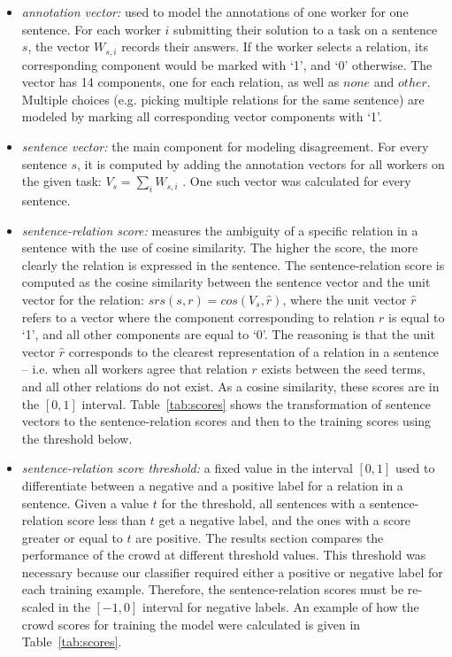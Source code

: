 \begin{itemize}

\item \textit{annotation vector:} used to model the annotations of one worker for one sentence.  For each worker $i$ submitting their solution to a task on a sentence $s$, the vector $W_{s,i}$ records their answers. If the worker selects a relation, its corresponding component would be marked with `1', and `0' otherwise.  The vector has 14 components, one for each relation, as well as $none$ and $other$. Multiple choices (e.g. picking multiple relations for the same sentence) are modeled by marking all corresponding vector components with `1'.

\item \textit{sentence vector:} the main component for modeling disagreement.  For every sentence $s$, it is computed by adding the annotation vectors for all workers on the given task: $V_{s} = \sum_{i}{W_{s,i}}$ .  One such vector was calculated for every sentence.   

\item \textit{sentence-relation score:} measures the ambiguity of a specific relation in a sentence with the use of cosine similarity. The higher the score, the more clearly the relation is expressed in the sentence. The sentence-relation score is computed as the cosine similarity between the sentence vector and the unit vector for the relation: $ srs(s, r) = cos(V_s, \hat{r}) $, where the unit vector $\hat{r}$ refers to a vector where the component corresponding to relation $r$ is equal to `1', and all other components are equal to `0'. The reasoning is that the unit vector $\hat{r}$ corresponds to the clearest representation of a relation in a sentence -- i.e. when all workers agree that relation $r$ exists between the seed terms, and all other relations do not exist. As a cosine similarity, these scores are in the $[0, 1]$ interval.  Table~\ref{tab:scores} shows the transformation of sentence vectors to the sentence-relation scores and then to the training scores using the threshold below.

\item \textit{sentence-relation score threshold:} a fixed value in the interval $[0, 1]$ used to differentiate between a negative and a positive label for a relation in a sentence. Given a value $t$ for the threshold, all sentences with a sentence-relation score less than $t$ get a negative label, and the ones with a score greater or equal to $t$ are positive. The results section compares the performance of the crowd at different threshold values. This threshold was necessary because our classifier required either a positive or negative label for each training example. Therefore, the sentence-relation scores must be re-scaled in the $[-1, 0]$ interval for negative labels. An example of how the crowd scores for training the model were calculated is given in Table~\ref{tab:scores}.

\end{itemize}

